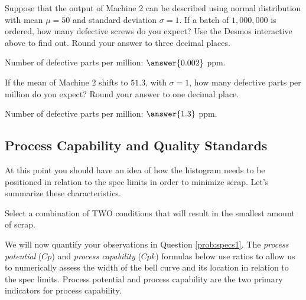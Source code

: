 \documentclass{ximera}
\begin{document}
\begin{question}\label{ex:defParts3}
    Suppose that the output of Machine 2 can be described using normal distribution with mean $\mu=50$ and standard deviation $\sigma=1$.  If a batch of $1,000,000$ is ordered, how many defective screws do you expect?  Use the Desmos interactive above to find out.  Round your answer to three decimal places.

    Number of defective parts per million: $\answer{0.002}$ ppm.

    If the mean of Machine 2 shifts to $51.3$, with $\sigma =1$, how many defective parts per million do you expect?  Round your answer to one decimal place.

    Number of defective parts per million: $\answer{1.3}$ ppm.
\end{question}

\subsection*{Process Capability and Quality Standards}
At this point you should have an idea of how the histogram needs to be positioned in relation to the spec limits in order to minimize scrap.  Let's summarize these characteristics.  
\begin{question}\label{prob:specs1}
Select a combination of TWO conditions that will result in the smallest amount of scrap.

    \begin{selectAll}
    \end{selectAll}
\end{question}

We will now quantify your observations in Question \ref{prob:specs1}.  The \emph{process potential} ($Cp$) and \emph{process capability} ($Cpk$) formulas below use ratios to allow us to numerically assess the width of the bell curve and its location in relation to the spec limits.  Process potential and process capability are the two primary indicators for process capability.
\end{document}
